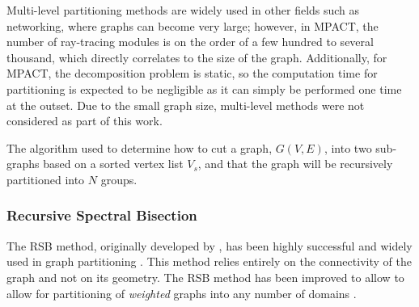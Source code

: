 {{{      Multi-level partitioning methods are widely used in other fields such as networking, where graphs can become very large; however, in MPACT, the number of ray-tracing modules is on the order of a few hundred to several thousand, which directly correlates to the size of the graph.
      Additionally, for MPACT, the decomposition problem is static, so the computation time for partitioning is expected to be negligible as it can simply be performed one time at the outset.
      Due to the small graph size, multi-level methods were not considered as part of this work.

      \begin{algorithm}[ht]
        \centering
        \caption{The algorithm used to determine how to cut a graph, $G(V,E)$, into two sub-graphs based on a sorted vertex list $V_s$, and that the graph will be recursively partitioned into $N$ groups.}
        \label{alg:Graph Cutting}
        \begin{algorithmic}[1]
             
             
          \EndProcedure
        \end{algorithmic}
      \end{algorithm}
      \subsubsection{Recursive Spectral Bisection}{\label{sssec:Spatial Decomposition:Recursive Spectral Bisection}
        The \ac{RSB} method, originally developed by \citet{Pothen1989}, has been highly successful and widely used in graph partitioning \cite{Simon1991,Spielman2007}.
        This method relies entirely on the connectivity of the graph and not on its geometry.
        The \ac{RSB} method has been improved to allow to allow for partitioning of \emph{weighted} graphs into any number of domains \cite{Hsieh1995}.

}}}}
